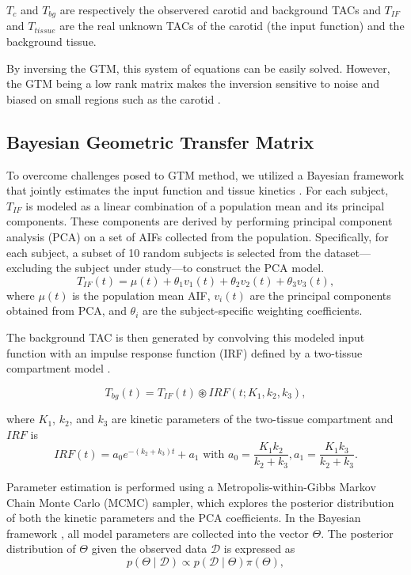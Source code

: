 $T_{c}$ and $T_{bg}$ are respectively the observered carotid and background TACs and $T_{IF}$ and $T_{tissue}$ are the real unknown TACs of the carotid (the input function) and the background tissue.

By inversing the GTM, this system of equations can be easily solved. However, the GTM being a low rank matrix makes the inversion sensitive to noise and biased on small regions such as the carotid \cite{zanotti2011image, boellaard2004effects}.

\subsection{Bayesian Geometric Transfer Matrix}
To overcome challenges posed to GTM method, we utilized a Bayesian framework that jointly estimates the input function and tissue kinetics \cite{irace2021bayesian}.
For each subject, $T_{IF}$ is modeled as a linear combination of a population mean and its principal components.
These components are derived by performing principal component analysis (PCA) on a set of AIFs collected from the population. Specifically, for each subject, a subset of 10 random subjects is selected from the dataset—excluding the subject under study—to construct the PCA model.
\begin{equation}
	T_{IF}(t) = \mu(t) + \theta_{1} v_{1}(t) + \theta_{2} v_{2}(t) + \theta_{3} v_{3}(t),
\end{equation}
where \(\mu(t)\) is the population mean AIF, \(v_{i}(t)\) are the principal components obtained from PCA, and \(\theta_{i}\) are the subject-specific weighting coefficients.

The background TAC is then generated by convolving this modeled input function with an impulse response function (IRF) defined by a two-tissue compartment model \cite{jouvie2013estimation}.

\begin{equation}
	T_{bg}(t) = T_{IF}(t) \circledast IRF(t; K_1, k_2, k_3),
\end{equation}

where $K_1$, $k_2$, and $k_3$ are kinetic parameters of the two-tissue compartment and $IRF$ is
\begin{equation}
	IRF(t) = a_0 e^{-(k_2+k_3)t} + a_1\text{ with } a_0= \frac{K_1 k_2}{k_2+k_3}, a_1= \frac{K_1 k_3}{k_2+k_3}.
\end{equation}



Parameter estimation is performed using a Metropolis-within-Gibbs Markov Chain Monte Carlo (MCMC) sampler, which explores the posterior distribution of both the kinetic parameters and the PCA coefficients.
In the Bayesian framework \cite{irace2021bayesian}, all model parameters are collected into the vector $\Theta$. The posterior distribution of $\Theta$ given the observed data $\mathcal{D}$ is expressed as
\begin{equation}
	p(\Theta \mid \mathcal{D}) \propto p(\mathcal{D} \mid \Theta) \pi(\Theta),
\end{equation}

